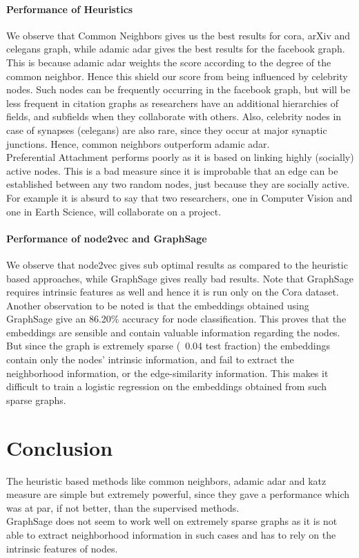 \documentclass[review]{elsarticle}
\begin{document}
\paragraph{\textbf{Performance of Heuristics}} We observe that Common Neighbors gives us the best results for cora, arXiv and celegans graph, while adamic adar gives the best results for the facebook graph. This is because adamic adar weights the score according to the degree of the common neighbor. Hence this shield our score from being influenced by celebrity nodes. Such nodes can be frequently occurring in the facebook graph, but will be less frequent in citation graphs as researchers have an additional hierarchies of fields, and subfields when they collaborate with others. Also, celebrity nodes in case of synapses (celegans) are also rare, since they occur at major synaptic junctions. Hence, common neighbors outperform adamic adar. \\
Preferential Attachment performs poorly as it is based on linking highly (socially) active nodes. This is a bad measure since it is improbable that an edge can be established between any two random nodes, just because they are socially active. For example it is absurd to say that two researchers, one in Computer Vision and one in Earth Science, will collaborate on a project.  \\
\paragraph{\textbf{Performance of node2vec and GraphSage}}
We observe that node2vec gives sub optimal results as compared to the heuristic based approaches, while GraphSage gives really bad results. Note that GraphSage requires intrinsic features as well and hence it is run only on the Cora dataset. Another observation to be noted is that the embeddings obtained using GraphSage give an 86.20\% accuracy for node classification. This proves that the embeddings are sensible and contain valuable information regarding the nodes. But since the graph is extremely sparse (~0.04 test fraction) the embeddings contain only the nodes' intrinsic information, and fail to extract the neighborhood information, or the edge-similarity information. This makes it difficult to train a logistic regression on the embeddings obtained from such sparse graphs. 
\section{Conclusion}
\noindent The heuristic based methods like common neighbors, adamic adar and katz measure are simple but extremely powerful, since they gave a performance which was at par, if not better, than the supervised methods. \\
GraphSage does not seem to work well on extremely sparse graphs as it is not able to extract neighborhood information in such cases and has to rely on the intrinsic features of nodes. \\

\newpage
\printbibliography
\end{document}

